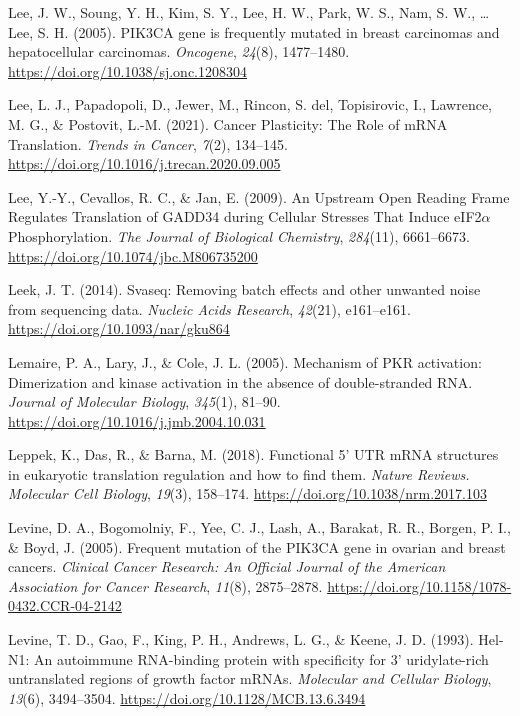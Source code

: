 \documentclass[12pt,openany]{book}
\begin{document}
\hypertarget{ref-Lee2005}{}
Lee, J. W., Soung, Y. H., Kim, S. Y., Lee, H. W., Park, W. S., Nam, S.
W., \ldots{} Lee, S. H. (2005). PIK3CA gene is frequently mutated in
breast carcinomas and hepatocellular carcinomas. \emph{Oncogene},
\emph{24}(8), 1477--1480. \url{https://doi.org/10.1038/sj.onc.1208304}

\hypertarget{ref-Lee2021}{}
Lee, L. J., Papadopoli, D., Jewer, M., Rincon, S. del, Topisirovic, I.,
Lawrence, M. G., \& Postovit, L.-M. (2021). Cancer Plasticity: The Role
of mRNA Translation. \emph{Trends in Cancer}, \emph{7}(2), 134--145.
\url{https://doi.org/10.1016/j.trecan.2020.09.005}

\hypertarget{ref-Lee2009}{}
Lee, Y.-Y., Cevallos, R. C., \& Jan, E. (2009). An Upstream Open Reading
Frame Regulates Translation of GADD34 during Cellular Stresses That
Induce eIF2\(\alpha\) Phosphorylation. \emph{The Journal of Biological
Chemistry}, \emph{284}(11), 6661--6673.
\url{https://doi.org/10.1074/jbc.M806735200}

\hypertarget{ref-Leek2014}{}
Leek, J. T. (2014). Svaseq: Removing batch effects and other unwanted
noise from sequencing data. \emph{Nucleic Acids Research},
\emph{42}(21), e161--e161. \url{https://doi.org/10.1093/nar/gku864}

\hypertarget{ref-Lemaire2005}{}
Lemaire, P. A., Lary, J., \& Cole, J. L. (2005). Mechanism of PKR
activation: Dimerization and kinase activation in the absence of
double-stranded RNA. \emph{Journal of Molecular Biology}, \emph{345}(1),
81--90. \url{https://doi.org/10.1016/j.jmb.2004.10.031}

\hypertarget{ref-Leppek2018}{}
Leppek, K., Das, R., \& Barna, M. (2018). Functional 5' UTR mRNA
structures in eukaryotic translation regulation and how to find them.
\emph{Nature Reviews. Molecular Cell Biology}, \emph{19}(3), 158--174.
\url{https://doi.org/10.1038/nrm.2017.103}

\hypertarget{ref-Levine2005}{}
Levine, D. A., Bogomolniy, F., Yee, C. J., Lash, A., Barakat, R. R.,
Borgen, P. I., \& Boyd, J. (2005). Frequent mutation of the PIK3CA gene
in ovarian and breast cancers. \emph{Clinical Cancer Research: An
Official Journal of the American Association for Cancer Research},
\emph{11}(8), 2875--2878.
\url{https://doi.org/10.1158/1078-0432.CCR-04-2142}

\hypertarget{ref-Levine1993}{}
Levine, T. D., Gao, F., King, P. H., Andrews, L. G., \& Keene, J. D.
(1993). Hel-N1: An autoimmune RNA-binding protein with specificity for
3' uridylate-rich untranslated regions of growth factor mRNAs.
\emph{Molecular and Cellular Biology}, \emph{13}(6), 3494--3504.
\url{https://doi.org/10.1128/MCB.13.6.3494}
\end{document}
